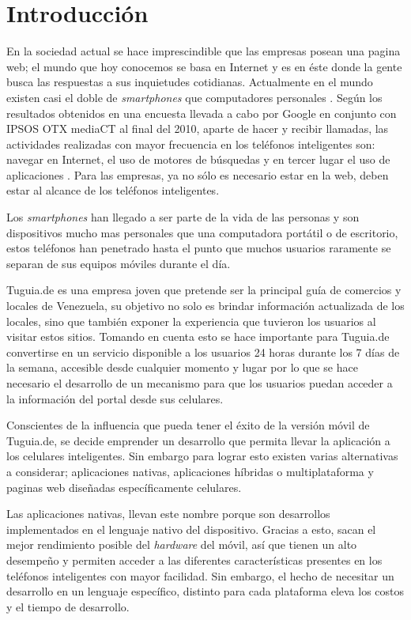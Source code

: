 \chapter*{Introducción}


En la sociedad actual se hace imprescindible que las empresas posean una pagina web; el mundo que hoy conocemos se basa en Internet y es en éste donde la gente busca las respuestas a sus inquietudes cotidianas. Actualmente en el mundo existen casi el doble de \textit{smartphones} que computadores personales \cite{DGT}. Según los resultados obtenidos en una encuesta llevada a cabo por Google en conjunto con IPSOS OTX mediaCT al final del 2010, aparte de hacer y recibir llamadas, las actividades realizadas con mayor frecuencia en los teléfonos inteligentes son: navegar en Internet, el uso de motores de búsquedas y en tercer lugar el uso de aplicaciones \cite{TMM}. Para las empresas, ya no sólo es necesario estar en la web, deben estar al alcance de los teléfonos inteligentes.

Los \textit{smartphones} han llegado a ser parte de la vida de las personas y son dispositivos mucho mas personales que una computadora portátil o de escritorio, estos teléfonos han penetrado hasta el punto que muchos usuarios raramente se separan de sus equipos móviles durante el día.

Tuguia.de es una empresa joven que pretende ser la principal guía de comercios y locales de Venezuela, su objetivo no solo es brindar información actualizada de los locales, sino que también exponer la experiencia que tuvieron los usuarios al visitar estos sitios. Tomando en cuenta esto se hace importante para Tuguia.de convertirse en un servicio disponible a los usuarios 24 horas durante los 7 días de la semana, accesible desde cualquier momento y lugar por lo que se hace necesario el desarrollo de un mecanismo para que los usuarios puedan acceder a la información del portal desde sus celulares.

Conscientes de la influencia que pueda tener el éxito de la versión móvil de Tuguia.de, se decide emprender un desarrollo que permita llevar la aplicación a los celulares inteligentes.  Sin embargo para lograr esto existen varias alternativas a considerar; aplicaciones nativas, aplicaciones híbridas o multiplataforma y paginas web diseñadas específicamente celulares.

Las aplicaciones nativas, llevan este nombre porque son desarrollos implementados en el lenguaje nativo del dispositivo. Gracias a esto, sacan el mejor rendimiento posible del \textit{hardware} del móvil, así que tienen un alto desempeño y permiten acceder a las diferentes características presentes en los teléfonos inteligentes con mayor facilidad. Sin embargo, el hecho de necesitar un desarrollo en un lenguaje específico, distinto para cada plataforma eleva los costos y el tiempo de desarrollo. 

